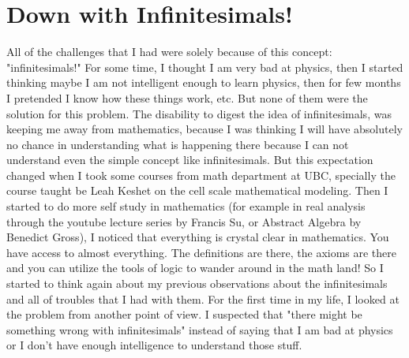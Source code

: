\documentclass[11pt,a4paper]{article}
\begin{document}
\section{Down with Infinitesimals!}
All of the challenges that I had were solely because of this concept: "infinitesimals!" For some time, I thought I am very bad at physics, then I started thinking maybe I am not intelligent enough to learn physics, then for few months I pretended I know how these things work, etc. But none of them were the solution for this problem. The disability to digest the idea of infinitesimals, was keeping me away from mathematics, because I was thinking I will have absolutely no chance in understanding what is happening there because I can not understand even the simple concept like infinitesimals. But this expectation changed when I took some courses from math department at UBC, specially the course taught be Leah Keshet on the cell scale mathematical modeling. Then I started to do more self study in mathematics (for example in real analysis through the youtube lecture series by Francis Su, or Abstract Algebra by Benedict Gross), I noticed that everything is crystal clear in mathematics. You have access to almost everything. The definitions are there, the axioms are there and you can utilize the tools of logic to wander around in the math land! So I started to think again about my previous observations about the infinitesimals and all of troubles that I had with them. For the first time in my life, I looked at the problem from another point of view. I suspected that "there might be something wrong with infinitesimals" instead of saying that I am bad at physics or I don't have enough intelligence to understand those stuff. 
\end{document}
